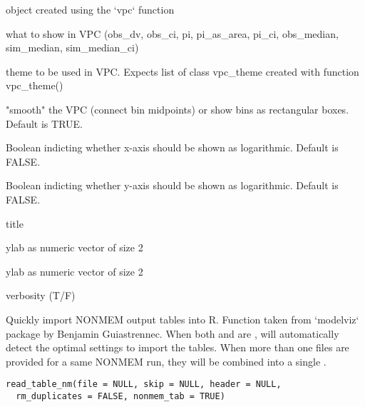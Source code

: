 \documentclass[letterpaper]{book}
\begin{document}
\begin{Arguments}
\begin{ldescription}
\item[\code{db}] object created using the `vpc` function

\item[\code{show}] what to show in VPC (obs\_dv, obs\_ci, pi, pi\_as\_area, pi\_ci, obs\_median, sim\_median, sim\_median\_ci)

\item[\code{vpc\_theme}] theme to be used in VPC. Expects list of class vpc\_theme created with function vpc\_theme()

\item[\code{smooth}] "smooth" the VPC (connect bin midpoints) or show bins as rectangular boxes. Default is TRUE.

\item[\code{log\_x}] Boolean indicting whether x-axis should be shown as logarithmic. Default is FALSE.

\item[\code{log\_y}] Boolean indicting whether y-axis should be shown as logarithmic. Default is FALSE.

\item[\code{title}] title

\item[\code{xlab}] ylab as numeric vector of size 2

\item[\code{ylab}] ylab as numeric vector of size 2

\item[\code{verbose}] verbosity (T/F)
\end{ldescription}
\end{Arguments}
%
\begin{Description}\relax
Quickly import NONMEM output tables into R. 
Function taken from `modelviz` package by Benjamin Guiastrennec.
When both  and  are ,
 will automatically detect the optimal
settings to import the tables. When more than one files are
provided for a same NONMEM run, they will be combined into
a single .
\end{Description}
%
\begin{Usage}
\begin{verbatim}
read_table_nm(file = NULL, skip = NULL, header = NULL,
  rm_duplicates = FALSE, nonmem_tab = TRUE)
\end{verbatim}
\end{Usage}
\end{document}
